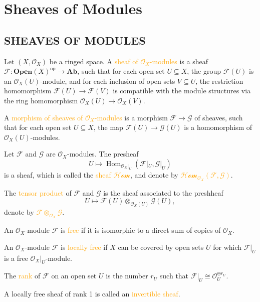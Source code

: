 \chapter{Sheaves of Modules}

\section*{SHEAVES OF MODULES}

\begin{definition}
	Let $\left(X,\mathcal{O}_X\right)$ be a ringed space. A \textcolor{orange}{sheaf of $\mathcal{O}_X$-modules} is a sheaf $\mathcal{F}:\mathbf{Open}(X)^\text{op}\rightarrow\mathbf{Ab}$, such that for each open set $U\subseteq X$, the group $\mathcal{F}(U)$ is an $\mathcal{O}_X(U)$-module, and for each inclusion of open sets $V\subseteq U$, the restriction homomorphism $\mathcal{F}(U)\rightarrow\mathcal{F}(V)$ is compatible with the module structures via the ring homomorphism $\mathcal{O}_X(U)\rightarrow\mathcal{O}_X(V)$.
	
	A \textcolor{orange}{morphism of sheaves of $\mathcal{O}_X$-modules} is a morphism $\mathcal{F}\rightarrow\mathcal{G}$ of sheaves, such that for each open set $U\subseteq X$, the map $\mathcal{F}(U)\rightarrow\mathcal{G}(U)$ is a homomorphism of $\mathcal{O}_X(U)$-modules.
\end{definition}

\begin{definition}
	Let $\mathcal{F}$ and $\mathcal{G}$ are $\mathcal{O}_X$-modules. The presheaf
	\begin{equation*}
		U\mapsto\operatorname{Hom}_{\mathcal{O}_X|_U}\!\left(\mathcal{F}|_U,\mathcal{G}|_U\right)
	\end{equation*}
	is a sheaf, which is called the \textcolor{orange}{sheaf $\mathcal{Hom}$}, and denote by \textcolor{orange}{$\mathcal{Hom}_{\mathcal{O}_X}(\mathcal{F},\mathcal{G})$}.
	
	The \textcolor{orange}{tensor product} of $\mathcal{F}$ and $\mathcal{G}$ is the sheaf associated to the preshheaf
	\begin{equation*}
		U\mapsto\mathcal{F}(U)\otimes_{\mathcal{O}_X(U)}\mathcal{G}(U),
	\end{equation*}
	denote by \textcolor{orange}{$\mathcal{F}\otimes_{\mathcal{O}_X}\mathcal{G}$}.
\end{definition}

\begin{definition}
	An $\mathcal{O}_X$-module $\mathcal{F}$ is \textcolor{orange}{free} if it is isomorphic to a direct sum of copies of $\mathcal{O}_X$.
	
	An $\mathcal{O}_X$-module $\mathcal{F}$ is \textcolor{orange}{locally free} if $X$ can be covered by open sets $U$ for which $\mathcal{F}|_U$ is a free $\mathcal{O}_X|_U$-module.
	
	The \textcolor{orange}{rank} of $\mathcal{F}$ on an open set $U$ is the number $r_U$ such that $\mathcal{F}|_U\cong\mathcal{O}_U^{\oplus r_U}$.
	
	A locally free sheaf of rank 1 is called an \textcolor{orange}{invertible sheaf}.
\end{definition}

